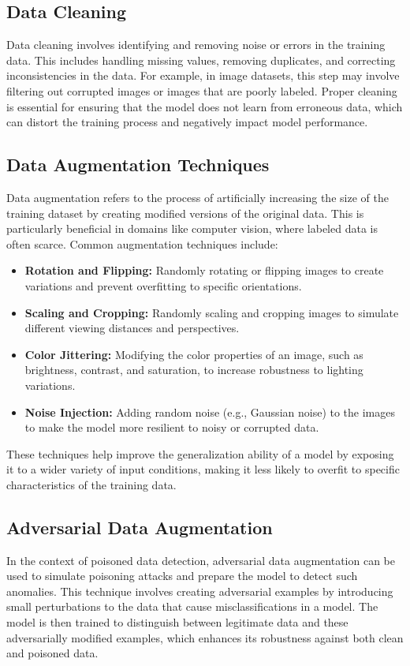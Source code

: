 \documentclass[14]{article}
\begin{document}
\subsection{Data Cleaning}
Data cleaning involves identifying and removing noise or errors in the training data. This includes handling missing values, removing duplicates, and correcting inconsistencies in the data. For example, in image datasets, this step may involve filtering out corrupted images or images that are poorly labeled. Proper cleaning is essential for ensuring that the model does not learn from erroneous data, which can distort the training process and negatively impact model performance.

\subsection{Data Augmentation Techniques}
Data augmentation refers to the process of artificially increasing the size of the training dataset by creating modified versions of the original data. This is particularly beneficial in domains like computer vision, where labeled data is often scarce. Common augmentation techniques include:

\begin{itemize}
    \item \textbf{Rotation and Flipping:} Randomly rotating or flipping images to create variations and prevent overfitting to specific orientations.
    \item \textbf{Scaling and Cropping:} Randomly scaling and cropping images to simulate different viewing distances and perspectives.
    \item \textbf{Color Jittering:} Modifying the color properties of an image, such as brightness, contrast, and saturation, to increase robustness to lighting variations.
    \item \textbf{Noise Injection:} Adding random noise (e.g., Gaussian noise) to the images to make the model more resilient to noisy or corrupted data.
\end{itemize}

These techniques help improve the generalization ability of a model by exposing it to a wider variety of input conditions, making it less likely to overfit to specific characteristics of the training data.

\subsection{Adversarial Data Augmentation}
In the context of poisoned data detection, adversarial data augmentation can be used to simulate poisoning attacks and prepare the model to detect such anomalies. This technique involves creating adversarial examples by introducing small perturbations to the data that cause misclassifications in a model. The model is then trained to distinguish between legitimate data and these adversarially modified examples, which enhances its robustness against both clean and poisoned data.
\end{document}
